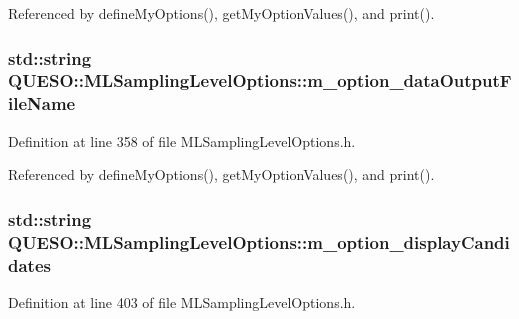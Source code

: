 Referenced by define\-My\-Options(), get\-My\-Option\-Values(), and print().

\hypertarget{class_q_u_e_s_o_1_1_m_l_sampling_level_options_a16d8f61e3c8cf7281a8ad20af005f0c3}{
\subsubsection[{m\-\_\-option\-\_\-data\-Output\-File\-Name}]{\setlength{\rightskip}{0pt plus 5cm}std\-::string Q\-U\-E\-S\-O\-::\-M\-L\-Sampling\-Level\-Options\-::m\-\_\-option\-\_\-data\-Output\-File\-Name\hspace{0.3cm}{\ttfamily [private]}}}\label{class_q_u_e_s_o_1_1_m_l_sampling_level_options_a16d8f61e3c8cf7281a8ad20af005f0c3}


Definition at line 358 of file M\-L\-Sampling\-Level\-Options.\-h.



Referenced by define\-My\-Options(), get\-My\-Option\-Values(), and print().

\hypertarget{class_q_u_e_s_o_1_1_m_l_sampling_level_options_a54c504f38cb33871eb90b38b4ba80e89}{
\subsubsection[{m\-\_\-option\-\_\-display\-Candidates}]{\setlength{\rightskip}{0pt plus 5cm}std\-::string Q\-U\-E\-S\-O\-::\-M\-L\-Sampling\-Level\-Options\-::m\-\_\-option\-\_\-display\-Candidates\hspace{0.3cm}{\ttfamily [private]}}}\label{class_q_u_e_s_o_1_1_m_l_sampling_level_options_a54c504f38cb33871eb90b38b4ba80e89}


Definition at line 403 of file M\-L\-Sampling\-Level\-Options.\-h.



